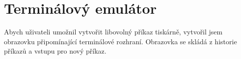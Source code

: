 \section{Terminálový emulátor}

Abych uživateli umožnil vytvořit libovolný příkaz tiskárně, vytvořil jsem obrazovku připomínající terminálové rozhraní.
Obrazovka se skládá z historie příkazů a vstupu pro nový příkaz.
